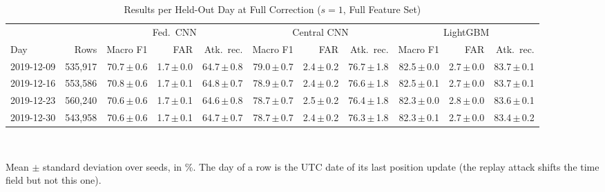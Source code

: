 \begin{table}[t]
\centering
\scriptsize
\caption{Results per Held-Out Day at Full Correction ($s=1$, Full Feature Set)}
\label{tab:perday}
\setlength{\tabcolsep}{2pt}
\begin{tabular}{lrrrrrrrrrr}
\toprule
& & \multicolumn{3}{c}{Fed.\ CNN} & \multicolumn{3}{c}{Central CNN} & \multicolumn{3}{c}{LightGBM} \\
\cmidrule(lr){3-5}\cmidrule(lr){6-8}\cmidrule(lr){9-11}
Day & Rows & Macro F1 & FAR & Atk.\ rec. & Macro F1 & FAR & Atk.\ rec. & Macro F1 & FAR & Atk.\ rec. \\
\midrule
2019-12-09 & 535{,}917 & 70.7{\,}$\pm${\,}0.6 & 1.7{\,}$\pm${\,}0.0 & 64.7{\,}$\pm${\,}0.8 & 79.0{\,}$\pm${\,}0.7 & 2.4{\,}$\pm${\,}0.2 & 76.7{\,}$\pm${\,}1.8 & 82.5{\,}$\pm${\,}0.0 & 2.7{\,}$\pm${\,}0.0 & 83.7{\,}$\pm${\,}0.1 \\
2019-12-16 & 553{,}586 & 70.8{\,}$\pm${\,}0.6 & 1.7{\,}$\pm${\,}0.1 & 64.8{\,}$\pm${\,}0.7 & 78.9{\,}$\pm${\,}0.7 & 2.4{\,}$\pm${\,}0.2 & 76.6{\,}$\pm${\,}1.8 & 82.5{\,}$\pm${\,}0.1 & 2.7{\,}$\pm${\,}0.0 & 83.7{\,}$\pm${\,}0.1 \\
2019-12-23 & 560{,}240 & 70.6{\,}$\pm${\,}0.6 & 1.7{\,}$\pm${\,}0.1 & 64.6{\,}$\pm${\,}0.8 & 78.7{\,}$\pm${\,}0.7 & 2.5{\,}$\pm${\,}0.2 & 76.4{\,}$\pm${\,}1.8 & 82.3{\,}$\pm${\,}0.0 & 2.8{\,}$\pm${\,}0.0 & 83.6{\,}$\pm${\,}0.1 \\
2019-12-30 & 543{,}958 & 70.6{\,}$\pm${\,}0.6 & 1.7{\,}$\pm${\,}0.1 & 64.7{\,}$\pm${\,}0.7 & 78.7{\,}$\pm${\,}0.7 & 2.4{\,}$\pm${\,}0.2 & 76.3{\,}$\pm${\,}1.8 & 82.3{\,}$\pm${\,}0.1 & 2.7{\,}$\pm${\,}0.0 & 83.4{\,}$\pm${\,}0.2 \\
\bottomrule
\end{tabular}
\\[2pt]
\parbox{\linewidth}{\scriptsize Mean $\pm$ standard deviation over  seeds, in \%. The day of a row is the UTC date of its last position update (the replay attack shifts the time field but not this one).}
\end{table}
